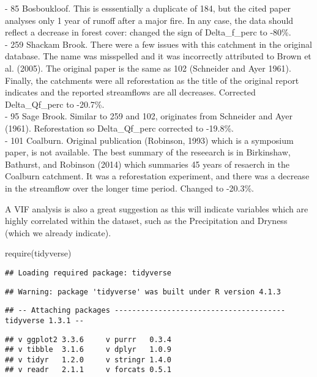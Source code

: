 \documentclass[]{elsarticle} %
\newenvironment{Shaded}{\begin{snugshade}}{\end{snugshade}}
\newcommand{\FunctionTok}[1]{\textcolor[rgb]{0.00,0.00,0.00}{#1}}
\newcommand{\NormalTok}[1]{#1}
\begin{document}
- 85 Bosboukloof. This is esssentially a duplicate of 184, but the cited paper analyses only 1 year of runoff after a major fire. In any case, the data should reflect a decrease in forest cover: changed the sign of Delta\_f\_perc to -80\%.\\
- 259 Shackam Brook. There were a few issues with this catchment in the original database. The name was misspelled and it was incorrectly attributed to Brown et al. (2005). The original paper is the same as 102 (Schneider and Ayer 1961). Finally, the catchments were all reforestation as the title of the original report indicates and the reported streamflows are all decreases. Corrected Delta\_Qf\_perc to -20.7\%.\\
- 95 Sage Brook. Similar to 259 and 102, originates from Schneider and Ayer (1961). Reforestation so Delta\_Qf\_perc corrected to -19.8\%.\\
- 101 Coalburn. Original publication (Robinson, 1993) which is a symposium paper, is not available. The best summary of the reseearch is in Birkinshaw, Bathurst, and Robinson (2014) which summaries 45 years of resaerch in the Coalburn catchment. It was a reforestation experiment, and there was a decrease in the streamflow over the longer time period. Changed to -20.3\%.

A VIF analysis is also a great suggestion as this will indicate variables which are highly correlated within the dataset, such as the Precipitation and Dryness (which we already indicate).

\begin{Shaded}
\begin{Highlighting}[]
\FunctionTok{require}\NormalTok{(tidyverse)}
\end{Highlighting}
\end{Shaded}

\begin{verbatim}
## Loading required package: tidyverse
\end{verbatim}

\begin{verbatim}
## Warning: package 'tidyverse' was built under R version 4.1.3
\end{verbatim}

\begin{verbatim}
## -- Attaching packages --------------------------------------- tidyverse 1.3.1 --
\end{verbatim}

\begin{verbatim}
## v ggplot2 3.3.6     v purrr   0.3.4
## v tibble  3.1.6     v dplyr   1.0.9
## v tidyr   1.2.0     v stringr 1.4.0
## v readr   2.1.1     v forcats 0.5.1
\end{verbatim}
\end{document}
